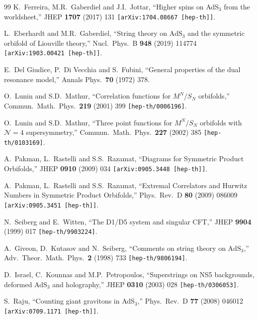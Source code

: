 \documentclass[12pt,a4paper]{article}
\begin{document}
\begin{thebibliography}{99}
K.~Ferreira, M.R.~Gaberdiel and J.I.~Jottar,
``Higher spins on AdS$_{3}$ from the worldsheet,''
JHEP {\bf 1707} (2017) 131
{\tt [arXiv:1704.08667 [hep-th]]}.
  
L.~Eberhardt and M.R.~Gaberdiel,
``String theory on $\mathrm{AdS}_3$ and the symmetric orbifold of Liouville theory,''
Nucl.\ Phys.\ B {\bf 948} (2019) 114774 
{\tt [arXiv:1903.00421 [hep-th]]}. 

  E.~Del Giudice, P.~Di Vecchia and S.~Fubini,
  ``General properties of the dual resonance model,''
  Annals Phys.\  {\bf 70} (1972) 378.

O.~Lunin and S.D.~Mathur,
``Correlation functions for $M^N / S_N$ orbifolds,''
Commun.\ Math.\ Phys.\  {\bf 219} (2001) 399
{\tt [hep-th/0006196]}.

 O.~Lunin and S.D.~Mathur,
``Three point functions for $M^N / S_N$ orbifolds with $\mathcal{N}=4$ supersymmetry,''
Commun.\ Math.\ Phys.\  {\bf 227} (2002) 385
{\tt [hep-th/0103169]}.

A.~Pakman, L.~Rastelli and S.S.~Razamat,
``Diagrams for Symmetric Product Orbifolds,''
JHEP {\bf 0910} (2009) 034
{\tt [arXiv:0905.3448 [hep-th]]}.

A.~Pakman, L.~Rastelli and S.S.~Razamat,
``Extremal Correlators and Hurwitz Numbers in Symmetric Product Orbifolds,''
Phys.\ Rev.\ D {\bf 80} (2009) 086009
{\tt [arXiv:0905.3451 [hep-th]]}.

N.~Seiberg and E.~Witten,
``The D1/D5 system and singular CFT,''
JHEP {\bf 9904} (1999) 017
{\tt [hep-th/9903224]}.

A.~Giveon, D.~Kutasov and N.~Seiberg,
``Comments on string theory on $\mathrm{AdS}_3$,''
Adv.\ Theor.\ Math.\ Phys.\  {\bf 2} (1998) 733
{\tt [hep-th/9806194]}.

D.~Israel, C.~Kounnas and M.P.~Petropoulos,
``Superstrings on NS5 backgrounds, deformed AdS$_3$ and holography,''
JHEP {\bf 0310} (2003) 028
{\tt [hep-th/0306053]}.

S.~Raju,
``Counting giant gravitons in AdS$_3$,''
Phys.\ Rev.\ D {\bf 77} (2008) 046012
{\tt [arXiv:0709.1171 [hep-th]]}.


\end{thebibliography}
\end{document}

